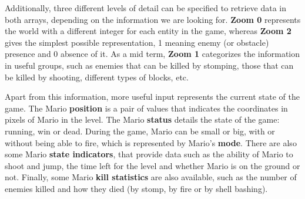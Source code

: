 \documentclass[conference]{IEEEtran}
\begin{document}


Additionally, three different levels of detail can be specified to retrieve data
in both arrays, depending on the information we are looking for. \textbf{Zoom 0}
represents the world with a different integer for each entity in the game, whereas
\textbf{Zoom 2} gives the simplest possible representation, 1 meaning enemy (or
obstacle) presence and 0 absence of it. As a mid term, \textbf{Zoom 1} categorizes
the information in useful groups, such as enemies that can be killed by
stomping, those that can be killed by shooting, different types of blocks, etc.

Apart from this information, more useful input represents the
current state of the game. The Mario \textbf{position} is a pair of
values that indicates the coordinates in pixels of Mario in the level. The
Mario \textbf{status} details the state of the game: running, win or dead. 
During the game, Mario can be small or big, with or without being able to fire, which
is represented by Mario's \textbf{mode}. There are also some Mario \textbf{state 
indicators}, that provide data such as the ability of Mario to shoot and jump, 
the time left for the level and whether Mario is on the ground or not.
Finally, some Mario \textbf{kill statistics} are also available, such as the number of enemies killed 
and how they died (by stomp, by fire or by shell bashing).
\end{document}
